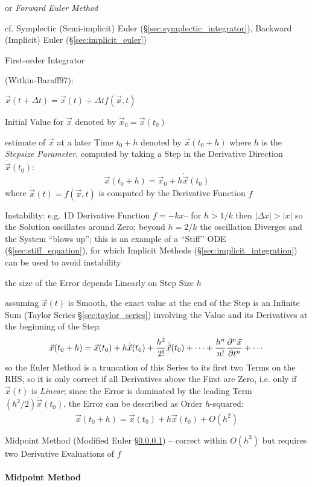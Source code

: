 or \emph{Forward Euler Method}

\fist cf. Symplectic (Semi-implicit) Euler (\S\ref{sec:symplectic_integrator}),
Backward (Implicit) Euler (\S\ref{sec:implicit_euler})

First-order Integrator

(Witkin-Baraff97):

$\vec{x}(t + \Delta{t}) = \vec{x}(t) + \Delta{t}f(\vec{x},t)$

Initial Value for $\vec{x}$ denoted by $\vec{x}_0 = \vec{x}(t_0)$

estimate of $\vec{x}$ at a later Time $t_0 + h$ denoted by $\vec{x}(t_0 + h)$
where $h$ is the \emph{Stepsize Parameter}, computed by taking a Step in the
Derivative Direction $\dot{\vec{x}}(t_0)$:
\[
  \vec{x}(t_0 + h) = \vec{x}_0 + h\dot{\vec{x}}(t_0)
\]
where $\dot{\vec{x}}(t) = f(\vec{x}, t)$ is computed by the Derivative Function
$f$

Instability: e.g. 1D Derivative Function $f = -kx$-- for $h > 1/k$ then
$|\Delta{x}| > |x|$ so the Solution oscillates around Zero; beyond $h = 2/k$ the
oscillation Diverges and the System ``blows up''; this is an example of a
``Stiff'' ODE (\S\ref{sec:stiff_equation}), for which Implicit Methods
(\S\ref{sec:implicit_integration}) can be used to avoid instability

the size of the Error depends Linearly on Step Size $h$

assuming $\vec{x}(t)$ is Smooth, the exact value at the end of the Step is an
Infinite Sum (Taylor Series \S\ref{sec:taylor_series}) involving the Value and
its Derivatives at the beginning of the Step:
\[
  \vec{x}(t_0 + h) = \vec{x}(t_0) + h\dot{\vec{x}}(t_0) +
    \frac{h^2}{2!}\ddot{\vec{x}}(t_0) + \cdots +
    \frac{h^n}{n!}\frac{\partial{^n\vec{x}}}{\partial{t^n}} + \cdots
\]
so the Euler Method is a truncation of this Series to its first two Terms on the
RHS, so it is only correct if all Derivatives above the First are Zero, i.e.
only if $\vec{x}(t)$ is \emph{Linear}; since the Error is dominated by the
leading Term $(h^2/2)\ddot{\vec{x}}(t_0)$, the Error can be described as Order
$h$-squared:
\[
  \vec{x}(t_0 + h) = \vec{x}(t_0) + h\dot{\vec{x}}(t_0) + O(h^2)
\]

Midpoint Method (Modified Euler \S\ref{sec:midpoint_method}) -- correct within
$O(h^3)$ but requires two Derivative Evaluations of $f$



\paragraph{Midpoint Method}\label{sec:midpoint_method}\hfill

